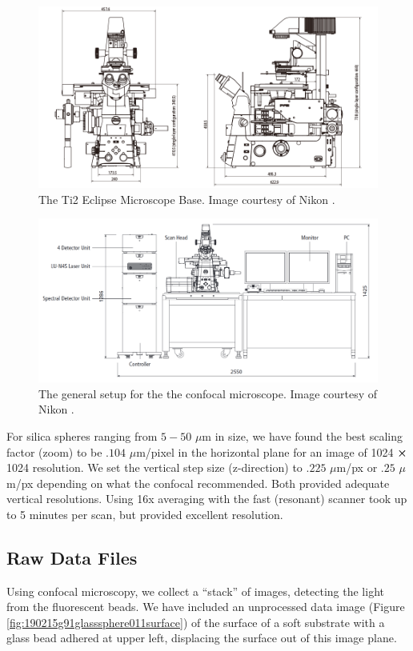 \begin{figure}
	\centering
	\includegraphics[width=0.8\linewidth]{confocal_stuff/Ti2_diagram_1}
	\caption[Nikon Ti2 Microscope Base]{The Ti2 Eclipse Microscope Base. Image courtesy of Nikon \cite{Nikon_manual}.}
	\label{fig:ti2diagram1}
\end{figure}
\begin{figure}[h]
	\centering
	\includegraphics[width=0.7\linewidth]{Chapters/Figures/confocal_setup}
	\caption[Confocal Setup]{The general setup for the the confocal microscope. Image courtesy of Nikon \cite{Nikon_manual}.}
	\label{fig:confocalsetup}
\end{figure}

For silica spheres ranging from $5-50$ $\mu$m in size, we have found the best scaling factor (zoom) to be $.104$ $\mu$m/pixel in the horizontal plane for an image of 1024 $ \cross $ 1024 resolution. We set the vertical step size (z-direction) to $.225$ $\mu$m/px or $.25$ $\mu$m/px depending on what the confocal recommended. Both provided adequate vertical resolutions. Using 16x averaging with the fast (resonant) scanner took up to 5 minutes per scan, but provided excellent resolution. 

\subsection{Raw Data Files}
Using confocal microscopy, we collect a ``stack'' of images, detecting the light from the fluorescent beads. We have included an unprocessed data image (Figure \ref{fig:190215g91glasssphere011surface}) of the surface of a soft substrate with a glass bead adhered at upper left, displacing the surface out of this image plane.

